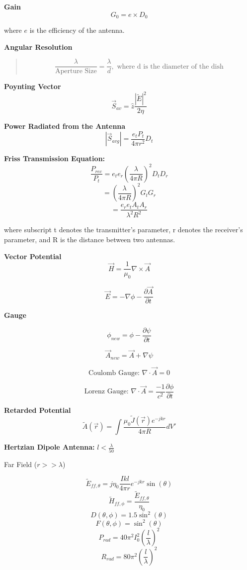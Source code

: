 \documentclass{article} %
\begin{document}
\textbf{Gain}
\[G_0 = e \times D_0\]

\begin{center}
    where $e$ is the efficiency of the antenna.
\end{center}

\textbf{Angular Resolution}
\begin{quote}
    \[\frac{\lambda}{\text{Aperture Size}} = \frac{\lambda}{d}, \text{ where d is the diameter of the dish}\]

\end{quote}

\textbf{Poynting Vector}
\[\vec{S}_{av} = \hat{z}\frac{|\widetilde{E}|^2}{2 \eta}\]

\textbf{Power Radiated from the Antenna}
\[|\vec{S}_{avg}| = \frac{e_t P_{t}}{4 \pi r^2}D_t\]

\textbf{Friss Transmission Equation:}
\[\frac{P_{rec}}{P_t} = e_t e_r \left(\frac{\lambda}{4\pi R}\right)^2 D_t D_r\]
\[=\left(\frac{\lambda}{4\pi R}\right)^2 G_t G_r\]
\[=\frac{e_r e_t A_t A_r}{\lambda^2 R^2}\]

\begin{center}
    where subscript t denotes the transmitter's parameter, r denotes the receiver's parameter, and R is the distance between two antennas.
\end{center}

\textbf{Vector Potential}
\[\vec{H} = \frac{1}{\mu_0} \nabla \times \vec{A}\]

\[\vec{E} = -\nabla \phi - \frac{\partial \vec{A}}{\partial t}\]

\textbf{Gauge}

\[\phi_{new} = \phi - \frac{\partial \psi}{\partial t}\]

\[\vec{A}_{new} = \vec{A} + \nabla \psi\]

\[\text{Coulomb Gauge: } \nabla \cdot \vec{A} = 0\]

\[\text{Lorenz Gauge: } \nabla \cdot \vec{A} = \frac{-1}{c^2} \frac{\partial \phi}{\partial t}\]


\textbf{Retarded Potential}
\[\widetilde{A}(\vec{r}) = \int \frac{\mu_0 \widetilde{J}(\vec{r})e^{-jkr}}{4\pi R} dV'\]



\textbf{Hertzian Dipole Antenna:}
$l < \frac{\lambda}{50}$

Far Field ($r >> \lambda$)

\[\widetilde{E}_{ff, \theta} = j \eta_0 \frac{I k l}{4 \pi r} e^{-jkr} \sin(\theta)\]
\[\widetilde{H}_{ff, \phi} = \frac{\widetilde{E}_{ff, \theta}}{\eta_0}\]
\[D(\theta, \phi) = 1.5 \sin^2(\theta)\]
\[F(\theta, \phi) = \sin^2(\theta)\]
\[P_{rad} = 40 \pi^2 I_0^2\left(\frac{l}{\lambda}\right)^2\]
\[R_{rad} = 80 \pi^2 \left(\frac{l}{\lambda}\right)^2\]
\end{document}
